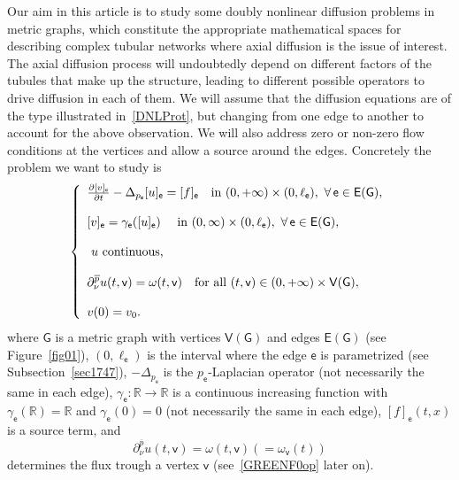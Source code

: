 \documentclass[reqno,12pt]{amsart}
\def\e{\mathsf{e}} 	%
\def\v{\mathsf{v}}	%
\newcommand{\G}{\mathsf{G}}	%
\newcommand{\V}{\mathsf{V}}	%
\newcommand{\E}{\mathsf{E}}	%
\numberwithin{equation}{section} %
\begin{document}
 Our aim in this article is to study some doubly nonlinear diffusion problems in metric graphs, which constitute the appropriate mathematical spaces for describing complex tubular networks where axial diffusion is the issue of interest. The axial diffusion process will undoubtedly depend on different factors of the tubules that make up the structure, leading to different possible operators to drive diffusion in each of them. We will assume that the diffusion equations are of the type illustrated in~\eqref{DNLProt}, but changing from one edge to another to account for the above observation. We will also address zero or non-zero flow conditions at the vertices and allow a source around the edges.
Concretely the problem we want to study is 
\begin{equation}\label{evpbintro1711} \left\{\begin{array}{l}
\frac{\partial [v]_\e}{\partial t}-\Delta_{p_\e} [u]_\e= [f]_\e\quad\hbox{in } (0,+\infty)\times(0,\ell_\e),\ \forall\, \e\in \E(\G),\\
\\ {}
 [v]_\e=\gamma_\e([u]_\e)\quad\hbox{ in } (0,\infty)\times (0,\ell_\e),\ \forall\, \e\in \E(\G),
\\ \\
\hbox{ $u$ continuous,}
\\ \\
\displaystyle  \partial^{\overline{p}}_\nu u(t,\v)={\omega(t,\v)}   \quad\hbox{for all } (t,\v)\in (0,+\infty)\times \V(\G),
\\ \\ v(0)=v_0.
\end{array}\right.
\end{equation}
where $\G$ is a metric graph with vertices $\V(\G)$  and edges $\E(\G)$ (see Figure~\ref{fig01}), $(0,\ell_\e)$ is the interval where the edge $\e$ is parametrized (see Subsection~\ref{sec1747}), $-\Delta_{p_\e}$ is the $p_\e$-Laplacian operator (not necessarily the same in each edge),  
 $\gamma_\e:\mathbb{R}\to \mathbb{R}$ is a continuous   increasing  function with $\gamma_\e(\mathbb{R})=\mathbb{R}$ and $\gamma_\e(0)=0$ (not necessarily the same in each edge),  $[f]_\e(t,x)$ is a source term, and $$\partial^{\overline{p}}_\nu u(t,\v)=\omega(t,\v)(=\omega_\v(t))$$   determines the flux trough a vertex $\v$  (see~\eqref{GREENF0op} later on).  
\end{document}
